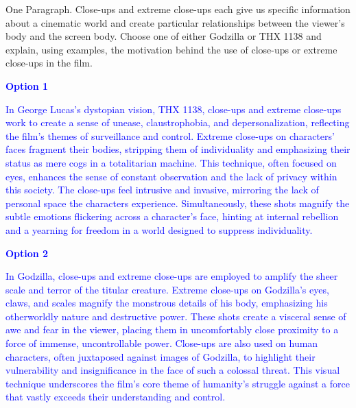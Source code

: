 \documentclass[11pt,fleqn]{book} %
\begin{document}
\begin{exercise}
    One Paragraph. Close-ups and extreme close-ups each give us specific information about a cinematic world and create particular relationships between the viewer’s body and the screen body. Choose one of either Godzilla or THX 1138 and explain, using examples, the motivation behind the use of close-ups or extreme close-ups in the film.

    \textcolor{blue}{
\textbf{Option 1}
}

    \textcolor{blue}{
In George Lucas's dystopian vision, THX 1138, close-ups and extreme close-ups work to create a sense of unease, claustrophobia, and depersonalization, reflecting the film's themes of surveillance and control. Extreme close-ups on characters' faces fragment their bodies, stripping them of individuality and emphasizing their status as mere cogs in a totalitarian machine.  This technique, often focused on eyes, enhances the sense of constant observation and the lack of privacy within this society. The close-ups feel intrusive and invasive, mirroring the lack of personal space the characters experience.  Simultaneously, these shots magnify the subtle emotions flickering across a character's face, hinting at  internal rebellion and a yearning for freedom in a world designed to suppress individuality.
}

\textcolor{blue}{
\textbf{Option 2}
}

\textcolor{blue}{
In Godzilla, close-ups and extreme close-ups are employed to amplify the sheer scale and terror of the titular creature. Extreme close-ups on Godzilla's eyes, claws, and scales magnify the monstrous details of his body, emphasizing his otherworldly nature and destructive power. These shots create a visceral sense of awe and  fear in the viewer, placing them in uncomfortably close proximity to a force of immense, uncontrollable power. Close-ups are also used on human characters, often juxtaposed against images of Godzilla, to highlight their vulnerability and insignificance in the face of such a colossal threat.  This visual technique underscores the film's core theme of humanity's struggle against a force that vastly exceeds their understanding and control.}
\end{exercise}
\end{document}

